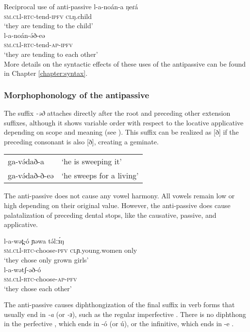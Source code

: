 \ex Reciprocal use of anti-passive
\ea \gll	l-a-noán-a 		ŋeɾá\\
	\textsc{sm.cl}l-\textsc{rtc}-tend-\textsc{ipfv}	\textsc{cl}ŋ.child  	\\
	\trans ‘they are tending to the child’\\
\ex \gll	l-a-noán-ə́ð-eə  		\\
	\textsc{sm.cl}l-\textsc{rtc}-tend-\textsc{ap-\textsc{ipfv}} \\
	\trans ‘they are tending to each other’\\ \label{ex:ch11:recipb}
\z
\z
More details on the syntactic effects of these uses of the antipassive can be found in Chapter \ref{chapter:syntax}.

\subsubsection{Morphophonology of the antipassive}
The suffix \textit{-əð} attaches directly after the root and preceding other extension suffixes, although it shows variable order with respect to the locative applicative depending on scope and meaning (see ). This suffix can be realized as [ð] if the preceding consonant is also [ð], creating a geminate.

\ea
\begin{tabular}[t]{ll}
ga-və́dað-a		&	‘he is sweeping it’\\
ga-və́dað-ð-eə 	&	‘he sweeps for a living’\\
\end{tabular} 
\z

The anti-passive does not cause any vowel harmony. All vowels remain low or high depending on their original value. However, the anti-passive does cause palatalization of preceding dental stops, like the causative, passive, and applicative. 

\ea
\ea \gll l-a-wət̪-ó 	ɲəwa 	tə́lːɜ́ŋ	\\
	\textsc{sm.cl}l-\textsc{rtc}-choose-\textsc{pfv}  \textsc{cl}ɲ.young.women only\\
	\trans ‘they chose only grown girls’\\
\ex \gll	l-a-wətʃ-əð-ó\\
		\textsc{sm.cl}l-\textsc{rtc}-choose-\textsc{ap-\textsc{pfv}}  	\\	
		\trans ‘they chose each other’\\
\z
\z

The anti-passive causes diphthongization of the final suffix in verb forms that usually end in \textit{-a} (or \textit{-ɜ}), such as the regular imperfective . There is no diphthong in the perfective , which ends in -ó (or ú), or the infinitive, which ends in -e . 

